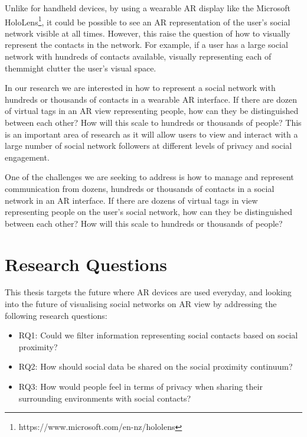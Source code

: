 Unlike for handheld devices, by using a wearable AR display like the Microsoft HoloLens\footnote{https://www.microsoft.com/en-nz/hololens}, it could be possible to see an AR representation of the user's social network visible at all times. However, this raise the question of how to visually represent the contacts in the network. For example, if a user has a large social network with hundreds of contacts available, visually representing each of themmight clutter the user's visual space.

In our research we are interested in how to represent a social network with hundreds or thousands of contacts in a wearable AR interface. If there are dozen of virtual tags in an AR view representing people, how can they be distinguished between each other? How will this scale to hundreds or thousands of people? This is an important area of research as it will allow users to view and interact with a large number of social network followers at different levels of privacy and social engagement.

One of the challenges we are seeking to address is how to manage and represent communication from dozens, hundreds or thousands of contacts in a social network in an AR interface. If there are dozens of virtual tags in view representing people on the user's social network, how can they be distinguished between each other? How will this scale to hundreds or thousands of people?

\section{Research Questions}

This thesis targets the future where AR devices are used everyday, and looking into the future of visualising social networks on AR view by addressing the following research questions: 


\begin{itemize}
    \item RQ1: Could we filter information representing social contacts based on social proximity?
    \item RQ2: How should social data be shared on the social proximity continuum?
    \item RQ3: How would people feel in terms of privacy when sharing their surrounding environments with social contacts?
\end{itemize}


